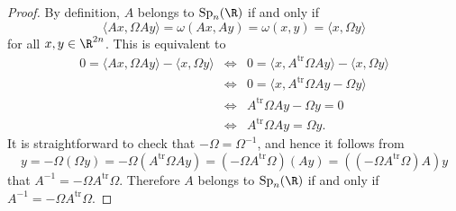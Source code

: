 \documentclass[10pt]{amsart}
\begin{document}
\begin{ex}
\begin{proof}
    By definition, $A$ belongs to $\operatorname{Sp}_n(\R)$ if and only if 
    $$\langle Ax, \Omega Ay\rangle = \omega(Ax,Ay) = \omega(x,y) = \langle x, \Omega y\rangle$$ for all $x,y \in \R^{2n}$.
    This is equivalent to 
    \begin{eqnarray*}
      0 = \langle Ax, \Omega Ay\rangle - \langle x, \Omega y\rangle
      &\iff& 0 = \langle x, A^\text{tr}\Omega Ay\rangle - \langle x, \Omega y\rangle\\
      &\iff& 0 = \langle x, A^\text{tr}\Omega Ay - \Omega y\rangle\\
      &\iff& A^\text{tr}\Omega Ay - \Omega y = 0\\
      &\iff& A^\text{tr}\Omega Ay = \Omega y.
    \end{eqnarray*}
    It is straightforward to check that $-\Omega = \Omega^{-1}$, and hence it follows from
    $$y = -\Omega(\Omega y) = 
    -\Omega(A^\text{tr}\Omega A y)
    = (-\Omega A^\text{tr}\Omega)(Ay)
    = ((-\Omega A^\text{tr}\Omega)A)y$$
    that $A^{-1} = -\Omega A^\text{tr} \Omega$.
    Therefore $A$ belongs to $\operatorname{Sp}_n(\R)$ if and only if $A^{-1} = -\Omega A^\text{tr} \Omega$.
  \end{proof}
\end{ex}
\end{document}
